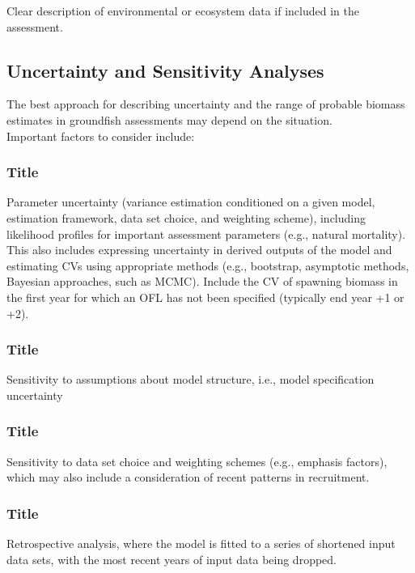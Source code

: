 \documentclass[12pt,]{article}
\begin{document}
Clear description of environmental or ecosystem data if included in the
assessment.

\subsection{Uncertainty and Sensitivity
Analyses}\label{uncertainty-and-sensitivity-analyses}

\label{sec:uncertainty} The best approach for describing uncertainty and
the range of probable biomass estimates in groundfish assessments may
depend on the situation.\\Important factors to consider include:

\subsubsection{Title}\label{title-33}

Parameter uncertainty (variance estimation conditioned on a given model,
estimation framework, data set choice, and weighting scheme), including
likelihood profiles for important assessment parameters (e.g., natural
mortality). This also includes expressing uncertainty in derived outputs
of the model and estimating CVs using appropriate methods (e.g.,
bootstrap, asymptotic methods, Bayesian approaches, such as MCMC).
Include the CV of spawning biomass in the first year for which an OFL
has not been specified (typically end year +1 or +2).

\subsubsection{Title}\label{title-34}

Sensitivity to assumptions about model structure, i.e., model
specification uncertainty

\subsubsection{Title}\label{title-35}

Sensitivity to data set choice and weighting schemes (e.g., emphasis
factors), which may also include a consideration of recent patterns in
recruitment.

\subsubsection{Title}\label{title-36}

Retrospective analysis, where the model is fitted to a series of
shortened input data sets, with the most recent years of input data
being dropped.
\end{document}
